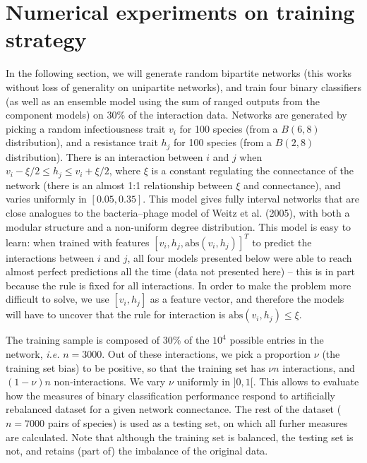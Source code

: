 \documentclass[11pt]{article}
\begin{document}
\hypertarget{numerical-experiments-on-training-strategy}{%
\section{Numerical experiments on training
strategy}\label{numerical-experiments-on-training-strategy}}

In the following section, we will generate random bipartite networks
(this works without loss of generality on unipartite networks), and
train four binary classifiers (as well as an ensemble model using the
sum of ranged outputs from the component models) on 30\% of the
interaction data. Networks are generated by picking a random
infectiousness trait \(v_i\) for 100 species (from a \(B(6,8)\)
distribution), and a resistance trait \(h_j\) for 100 species (from a
\(B(2,8)\) distribution). There is an interaction between \(i\) and
\(j\) when \(v_i-\xi/2 \le h_j \le v_i+\xi/2\), where \(\xi\) is a
constant regulating the connectance of the network (there is an almost
1:1 relationship between \(\xi\) and connectance), and varies uniformly
in \([0.05, 0.35]\). This model gives fully interval networks that are
close analogues to the bacteria--phage model of Weitz et al. (2005),
with both a modular structure and a non-uniform degree distribution.
This model is easy to learn: when trained with features
\([v_i, h_j, \text{abs}(v_i, h_j)] ^T\) to predict the interactions
between \(i\) and \(j\), all four models presented below were able to
reach almost perfect predictions all the time (data not presented here)
-- this is in part because the rule is fixed for all interactions. In
order to make the problem more difficult to solve, we use \([v_i, h_j]\)
as a feature vector, and therefore the models will have to uncover that
the rule for interaction is \(\text{abs}(v_i, h_j) \le \xi\).

The training sample is composed of 30\% of the \(10^4\) possible entries
in the network, \emph{i.e.} \(n=3000\). Out of these interactions, we
pick a proportion \(\nu\) (the training set bias) to be positive, so
that the training set has \(\nu n\) interactions, and \((1-\nu) n\)
non-interactions. We vary \(\nu\) uniformly in \(]0,1[\). This allows to
evaluate how the measures of binary classification performance respond
to artificially rebalanced dataset for a given network connectance. The
rest of the dataset (\(n=7000\) pairs of species) is used as a testing
set, on which all furher measures are calculated. Note that although the
training set is balanced, the testing set is not, and retains (part of)
the imbalance of the original data.
\end{document}
